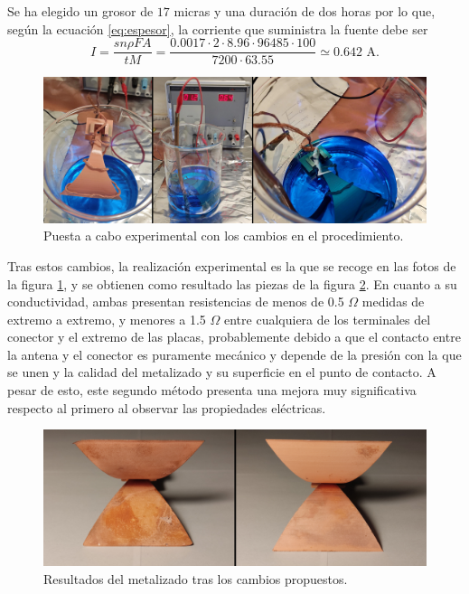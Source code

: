 \documentclass[11pt,a4paper,twoside,pdf]{article}
\numberwithin{equation}{section}
\begin{document}
Se ha elegido un grosor de $17$ micras y una duración de dos horas por lo que, según la ecuación \ref{eq:espesor}, la corriente que suministra la fuente debe ser
\begin{equation*}
    I = \frac{sn\rho FA}{tM} = \frac{0.0017\cdot2\cdot8.96\cdot96485\cdot100}{7200\cdot63.55} \simeq 0.642 \text{ A.}
\end{equation*}
\vspace{-0.6cm}
\begin{figure}[!h]
    \centering
    \includegraphics[width=\linewidth]{img/Metalizado/metalizadoCampana.jpg}
    \vspace{-0.7cm}
    \caption{Puesta a cabo experimental con los cambios en el procedimiento.}
    \label{fig:campana}
\end{figure}

Tras estos cambios, la realización experimental es la que se recoge en las fotos de la figura \ref{fig:campana}, y se obtienen como resultado las piezas de la figura \ref{fig:metalizado3}. En cuanto a su conductividad, ambas presentan resistencias de menos de 0.5 $\Omega$ medidas de extremo a extremo, y menores a 1.5 $\Omega$ entre cualquiera de los terminales del conector y el extremo de las placas, probablemente debido a que el contacto entre la antena y el conector es puramente mecánico y depende de la presión con la que se unen y la calidad del metalizado y su superficie en el punto de contacto. A pesar de esto, este segundo método presenta una mejora muy significativa respecto al primero al observar las propiedades eléctricas.
\begin{figure}[!h]
    \centering
    \includegraphics[width=0.9\linewidth]{img/Metalizado/resultadosMetalizado2.jpg}
    \caption{Resultados del metalizado tras los cambios propuestos.}
    \label{fig:metalizado3}
\end{figure}
\end{document}
